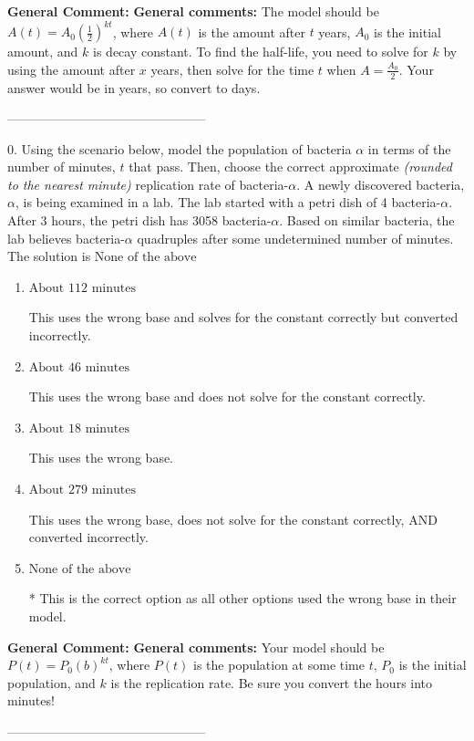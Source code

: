 \documentclass{extbook}[14pt]
\begin{document}
\textbf{General Comment:} \textbf{General comments:} The model should be $A(t) = A_0 (\frac{1}{2})^{kt}$, where $A(t)$ is the amount after $t$ years, $A_0$ is the initial amount, and $k$ is decay constant. To find the half-life, you need to solve for $k$ by using the amount after $x$ years, then solve for the time $t$ when $A = \frac{A_0}{2}$. Your answer would be in years, so convert to days. 

-----------------------------------------------

0. Using the scenario below, model the population of bacteria $\alpha$ in terms of the number of minutes, $t$ that pass. Then, choose the correct approximate \textit{(rounded to the nearest minute)} replication rate of bacteria-$\alpha$.
A newly discovered bacteria, $\alpha$, is being examined in a lab. The lab started with a petri dish of 4 bacteria-$\alpha$. After 3 hours, the petri dish has 3058 bacteria-$\alpha$. Based on similar bacteria, the lab believes bacteria-$\alpha$ quadruples after some undetermined number of minutes. 
The solution is $ \text{None of the above} $ 

\begin{enumerate}[label=\Alph*.] 
\item $ \text{About } 112 \text{ minutes} $ 

 This uses the wrong base and solves for the constant correctly but converted incorrectly. 
\item $ \text{About } 46 \text{ minutes} $ 

 This uses the wrong base and does not solve for the constant correctly. 
\item $ \text{About } 18 \text{ minutes} $ 

 This uses the wrong base. 
\item $ \text{About } 279 \text{ minutes} $ 

 This uses the wrong base, does not solve for the constant correctly, AND converted incorrectly. 
\item $ \text{None of the above} $ 

 * This is the correct option as all other options used the wrong base in their model. 
\end{enumerate} 
 
\textbf{General Comment:} \textbf{General comments:} Your model should be $P(t) = P_0(b)^{kt}$, where $P(t)$ is the population at some time $t$, $P_0$ is the initial population, and $k$ is the replication rate. Be sure you convert the hours into minutes! 

-----------------------------------------------
\end{document}
